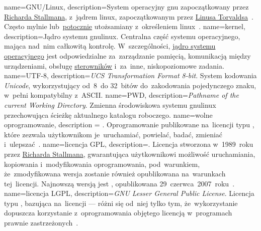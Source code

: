 {
	name={GNU/Linux},
	description={System operacyjny \gls{gnu} zapoczątkowany przez \href{https://en.wikipedia.org/wiki/Richard_Stallman}{Richarda Stallmana}, z~jądrem \gls{linux}, zapoczątkowanym przez \href{https://en.wikipedia.org/wiki/Linus_Torvalds}{Linusa Torvaldsa}~\cite{gnulinux}. Często mylnie lub~\href{https://en.wikipedia.org/wiki/GNU/Linux_naming_controversy}{potocznie} utożsamiany z~określeniem \gls{linux}~\cite{gnu-faq,wiki:linux-naming-controversy}.}
}
{
	name={kernel},
	description={Jądro systemu \gls{gnulinux}. Centralna część systemu operacyjnego, mająca nad~nim całkowitą kontrolę. W~szczególności, \href{https://en.wikipedia.org/wiki/Kernel_(operating_system)}{jądro systemu operacyjnego} jest odpowiedzialne za~zarządzanie pamięcią, komunikacją między urządzeniami, obsługę \href{https://lwn.net/Kernel/LDD3/}{sterowników} i~za~inne, niskopoziomowe zadania.}
}
{
	name={UTF-8},
	description={\emph{UCS Transformation Format 8-bit}. System kodowania \emph{Unicode}, wykorzystujący od~8~do 32~bitów do~zakodowania pojedynczego znaku, w~pełni kompatybilny z~\gls{ASCII}.}
}
{
	name={PWD},
	description={\emph{Pathname of the current Working Directory}. Zmienna środowiskowa systemu \gls{gnulinux} przechowująca ścieżkę aktualnego katalogu roboczego.}
}
{
	name={wolne oprogramowanie},
	description = {. Oprogramowanie publikowane na~licencji typu , które zezwala użytkownikom je~uruchamiać, powielać, badać, zmieniać i~ulepszać~\cite{free-software}.}
}
{
	name={licencja GPL},
	description={. Licencja  stworzona w~1989~roku przez \href{https://en.wikipedia.org/wiki/Richard_Stallman}{Richarda Stallmana}, gwarantująca użytkownikowi możliwość uruchamiania, kopiowania i~modyfikowania oprogramowania, pod~warunkiem, że~zmodyfikowana wersja zostanie również opublikowana na~warunkach tej~licencji. Najnowszą wersją  jest , opublikowana 29~czerwca~2007~roku~\cite{gpl3,wiki:licenses-comparison}.}
}
{
	name={licencja LGPL},
	description={\emph{GNU Lesser General Public License}. Licencja typu , bazująca na~licencji  --- różni się od~niej tylko tym, że~wykorzystanie  dopuszcza korzystanie z~oprogramowania objętego licencją w~programach prawnie zastrzeżonych~\cite{lgpl3,why-not-lgpl,wiki:licenses-comparison}.}
}
